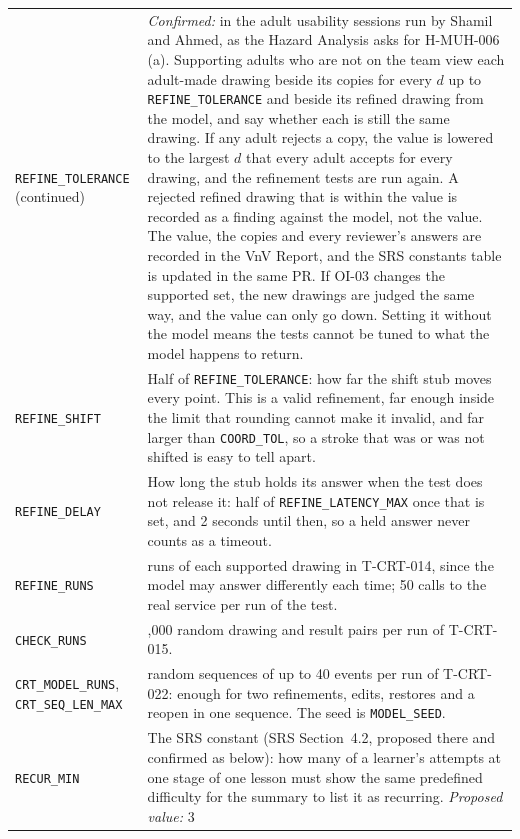 \documentclass[12pt, titlepage]{article}
\begin{document}
{\begin{longtable}{@{}>{\raggedright\arraybackslash}p{}%
>{\raggedright\arraybackslash}p{}@{}}
\addlinespace
\texttt{REFINE\_TOLERANCE} (continued) & \emph{Confirmed:} in the adult usability sessions run by
Shamil and Ahmed, as the Hazard Analysis asks for H-MUH-006 (a). Supporting
adults who are not on the team view each adult-made drawing beside its copies
for every $d$ up to \texttt{REFINE\_TOLERANCE} and beside its refined drawing
from the model, and say whether each is still the same drawing. If any adult rejects
a copy, the value is lowered to the largest $d$ that every adult accepts for
every drawing, and the refinement tests are run again. A rejected refined
drawing that is within the value is recorded as a finding against the model,
not the value. The value, the copies and every reviewer's answers are
recorded in the VnV Report, and the SRS constants table is updated in the
same PR. If OI-03 changes the supported set, the new drawings are judged the
same way, and the value can only go down. Setting it without the model means
the tests cannot be tuned to what the model happens to return.\\
\addlinespace
\texttt{REFINE\_SHIFT} & Half of \texttt{REFINE\_TOLERANCE}: how far the shift
stub moves every point. This is a valid refinement, far enough inside the limit
that rounding cannot make it invalid, and far larger than \texttt{COORD\_TOL},
so a stroke that was or was not shifted is easy to tell apart.\\
\addlinespace
\texttt{REFINE\_DELAY} & How long the stub holds its answer when the test does
not release it: half of \texttt{REFINE\_LATENCY\_MAX} once that is set, and 2
seconds until then, so a held answer never counts as a timeout.\\
\addlinespace
\texttt{REFINE\_RUNS} & 10 runs of each supported drawing in T-CRT-014, since
the model may answer differently each time; 50 calls to the real service per
run of the test.\\
\addlinespace
\texttt{CHECK\_RUNS} & 2,000 random drawing and result pairs per run of
T-CRT-015.\\
\addlinespace
\texttt{CRT\_MODEL\_RUNS}, \texttt{CRT\_SEQ\_LEN\_MAX} & 500 random sequences
of up to 40 events per run of T-CRT-022: enough for two refinements, edits,
restores and a reopen in one sequence. The seed is \texttt{MODEL\_SEED}.\\
\addlinespace
\texttt{RECUR\_MIN} & The SRS constant (SRS Section~4.2, proposed there
and confirmed as below): how many of
a learner's attempts at one stage of one lesson must show the same predefined
difficulty for the summary to list it as recurring. \emph{Proposed value:} 3

\end{longtable}}
\end{document}
